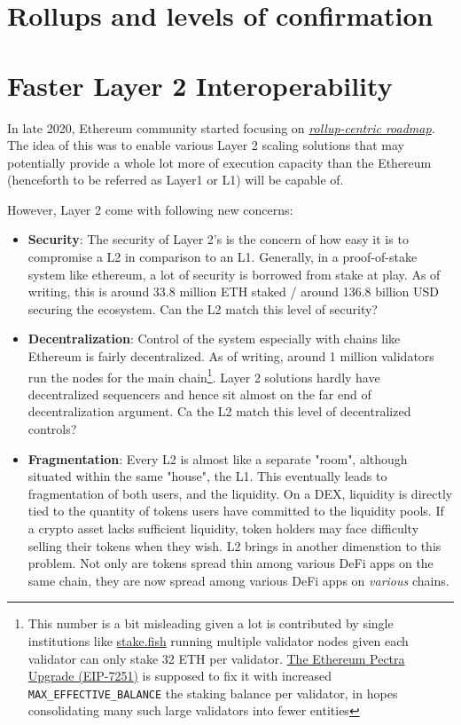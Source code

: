 \section{Rollups and levels of confirmation}

\section{Faster Layer 2 Interoperability}
In late 2020, Ethereum community started focusing on \href{https://ethereum-magicians.org/t/a-rollup-centric-ethereum-roadmap/4698}{\emph{rollup-centric roadmap}}. The idea of this was to enable various Layer 2 scaling solutions that may potentially provide a whole lot more of execution capacity than the Ethereum (henceforth to be referred as Layer1 or L1) will be capable of. 

However, Layer 2 come with following new concerns:
\begin{itemize}
    \item \textbf{Security}: The security of Layer 2's is the concern of how easy it is to compromise a L2 in comparison to an L1. Generally, in a proof-of-stake system like ethereum, a lot of security is borrowed from stake at play. As of writing, this is around 33.8 million ETH staked / around 136.8 billion USD securing the ecosystem. Can the L2 match this level of security?
    \item \textbf{Decentralization}: Control of the system especially with chains like Ethereum is fairly decentralized. As of writing, around 1 million validators run the nodes for the main chain\footnote{This number is a bit misleading given a lot is contributed by single institutions like \href{stake.fish}{stake.fish} running multiple validator nodes given each validator can only stake 32 ETH per validator. \href{https://eips.ethereum.org/EIPS/eip-7251}{The Ethereum Pectra Upgrade (EIP-7251)} is supposed to fix it with increased \texttt{MAX\_EFFECTIVE\_BALANCE} the staking balance per validator, in hopes consolidating many such large validators into fewer entities}. Layer 2 solutions hardly have decentralized sequencers and hence sit almost on the far end of decentralization argument. Ca the L2 match this level of decentralized controls? 
    \item \textbf{Fragmentation}: Every L2 is almost like a separate "room", although situated within the same "house", the L1. This eventually leads to fragmentation of both users, and the liquidity. On a DEX, liquidity is directly tied to the quantity of tokens users have committed to the liquidity pools. If a crypto asset lacks sufficient liquidity, token holders may face difficulty selling their tokens when they wish. L2 brings in another dimenstion to this problem. Not only are tokens spread thin among various DeFi apps on the same chain, they are now spread among various DeFi apps on \emph{various} chains.
\end{itemize}

